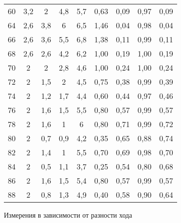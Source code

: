 \begin{tabular}{c|cccc|cccc}
60             & 3,2     & 2       & 4,8     & 5,7     & 0,63       & 0,09       & 0,97         & 0,09         \\
64             & 2,6     & 3,8     & 6       & 6,5     & 1,46       & 0,04       & 0,98         & 0,04         \\
66             & 2,6     & 3,6     & 5,5     & 6,8     & 1,38       & 0,11       & 0,99         & 0,11         \\
68             & 2,6     & 2,6     & 4,2     & 6,2     & 1,00       & 0,19       & 1,00         & 0,19         \\
70             & 2       & 2       & 2,8     & 4,6     & 1,00       & 0,24       & 1,00         & 0,24         \\
72             & 2       & 1,5     & 2       & 4,5     & 0,75       & 0,38       & 0,99         & 0,39         \\
74             & 2       & 1,2     & 1,7     & 4,4     & 0,60       & 0,44       & 0,97         & 0,46         \\
76             & 2       & 1,6     & 1,5     & 5,5     & 0,80       & 0,57       & 0,99         & 0,57         \\
78             & 2       & 1,6     & 1       & 6       & 0,80       & 0,71       & 0,99         & 0,72         \\
80             & 2       & 0,7     & 0,9     & 4,2     & 0,35       & 0,65       & 0,88         & 0,74         \\
82             & 2       & 1,4     & 1       & 5,5     & 0,70       & 0,69       & 0,98         & 0,70         \\
84             & 2       & 0,5     & 1,1     & 3,7     & 0,25       & 0,54       & 0,80         & 0,68         \\
86             & 2       & 1,6     & 1,5     & 5,4     & 0,80       & 0,57       & 0,99         & 0,57         \\
88             & 2       & 0,8     & 1,3     & 4,9     & 0,40       & 0,58       & 0,90         & 0,64         \\ \bottomrule
\end{tabular}
\caption{Измерения в зависимости от разности хода}
\label{table2}